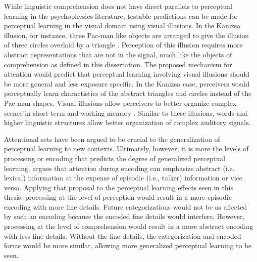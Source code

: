 While linguistic comprehension does not have direct parallels to perceptual learning in the psychophysics literature, testable predictions can be made for perceptual learning in the visual domain using visual illusions.
In the Kanizsa illusion, for instance, three Pac-man like objects are arranged to give the illusion of three circles overlaid by a triangle \citep{Kanizsa1976}.
Perception of this illusion requires more abstract representations that are not in the signal, much like the objects of comprehension as defined in this dissertation.
The proposed mechanism for attention would predict that perceptual learning involving visual illusions should be more general and less exposure specific.
In the Kanizsa case, perceivers would perceptually learn charactistics of the abstract triangles and circles instead of the Pac-man shapes.
Visual illusions allow perceivers to better organize complex scenes in short-term and working memory \citep{Vandenbroucke2012}.
Similar to these illusions, words and higher linguistic structures allow better organization of complex auditory signals.

Attentional sets have been argued to be crucial to the generalization of perceptual learning to new contexts.
Ultimately, however, it is more the levels of processing \citep{Cutler1987} or encoding that predicts the degree of generalized perceptual learning.
\citet{Theodore2015} argues that attention during encoding can emphasize abstract (i.e. lexical) information at the expense of episodic (i.e., talker) information or vice versa.
Applying that proposal to the perceptual learning effects seen in this thesis, processing at the level of perception would result in a more episodic encoding with more fine details.
Future categorizations would not be as affected by such an encoding because the encoded fine details would interfere.
However, processing at the level of comprehension would result in a more abstract encoding with less fine details.
Without the fine details, the categorization and encoded forms would be more similar, allowing more generalized perceptual learning to be seen.





